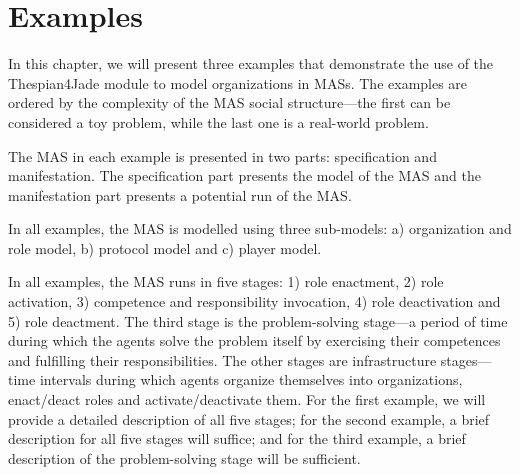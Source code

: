 
\chapter{Examples}

In this chapter, we will present three examples that demonstrate the use of the Thespian4Jade module to model organizations in MASs.
The examples are ordered by the complexity of the MAS social structure---the first can be considered a toy problem, while the last one is a real-world problem.

The MAS in each example is presented in two parts: specification and manifestation.
The specification part presents the model of the MAS and the manifestation part presents a potential run of the MAS.

In all examples, the MAS is modelled using three sub-models: a) organization and role model, b) protocol model and c) player model.

In all examples, the MAS runs in five stages: 1) role enactment, 2) role activation, 3) competence and responsibility invocation, 4) role deactivation and 5) role deactment.
The third stage is the problem-solving stage---a period of time during which the agents solve the problem itself by exercising their competences and fulfilling their responsibilities.
The other stages are infrastructure stages---time intervals during which agents organize themselves into organizations, enact/deact roles and activate/deactivate them.
For the first example, we will provide a detailed description of all five stages; for the second example, a brief description for all five stages will suffice; and for the third example, a brief description of the problem-solving stage will be sufficient.

